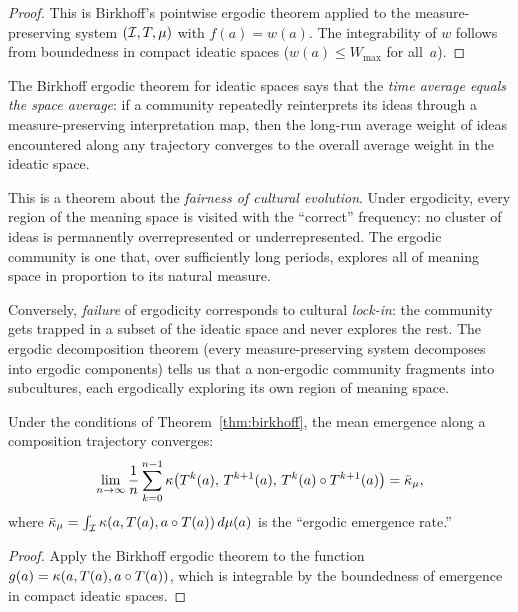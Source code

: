 \begin{proof}
This is Birkhoff's pointwise ergodic theorem applied to the
measure-preserving system $(\mathcal{I}, T, \mu)$ with $f(a) = w(a)$.
The integrability of $w$ follows from boundedness in compact
ideatic spaces ($w(a) \le W_{\max}$ for all~$a$).
\end{proof}

\begin{interpretation}
The Birkhoff ergodic theorem for ideatic spaces says that the
\emph{time average equals the space average}: if a community
repeatedly reinterprets its ideas through a measure-preserving
interpretation map, then the long-run average weight of ideas
encountered along any trajectory converges to the overall average
weight in the ideatic space.

This is a theorem about the \emph{fairness of cultural evolution}.
Under ergodicity, every region of the meaning space is visited
with the ``correct'' frequency: no cluster of ideas is permanently
overrepresented or underrepresented.  The ergodic community is one
that, over sufficiently long periods, explores all of meaning space
in proportion to its natural measure.

Conversely, \emph{failure} of ergodicity corresponds to cultural
\emph{lock-in}: the community gets trapped in a subset of the ideatic
space and never explores the rest.  The ergodic decomposition theorem
(every measure-preserving system decomposes into ergodic components)
tells us that a non-ergodic community fragments into subcultures, each
ergodically exploring its own region of meaning space.
\end{interpretation}

\begin{theorem}
\label{thm:mean-emergence-convergence}
Under the conditions of Theorem~\ref{thm:birkhoff}, the mean emergence
along a composition trajectory converges:
\[
  \lim_{n \to \infty} \frac{1}{n}
  \sum_{k=0}^{n-1} \kappa\bigl(T^k(a),\, T^{k+1}(a),\,
  T^k(a) \circ T^{k+1}(a)\bigr)
  = \bar{\kappa}_\mu,
\]
where $\bar{\kappa}_\mu = \int_{\mathcal{I}} \kappa(a, T(a), a \circ T(a))\,
d\mu(a)$ is the ``ergodic emergence rate.''
\end{theorem}

\begin{proof}
Apply the Birkhoff ergodic theorem to the function
$g(a) = \kappa(a, T(a), a \circ T(a))$, which is integrable
by the boundedness of emergence in compact ideatic spaces.
\end{proof}


